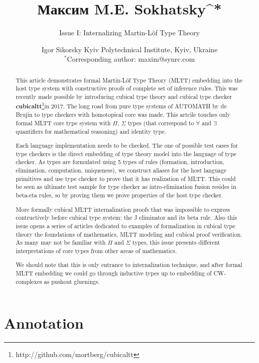 \documentclass{article}
\theoremstyle{definition}
\begin{document}
\title{\small Максим M.E. Sokhatsky^{*}}
\author{Issue I: Internalizing Martin-Löf Type Theory}
\date{ \small Igor Sikorsky Kyiv Polytechnical Institute, Kyiv, Ukraine\\
       \small $^*$Corresponding author: maxim@synrc.com}

\maketitle

\section*{Annotation}

\begin{abstract}

This article demonstrates formal Martin-Löf Type Theory (MLTT) embedding into the host type system
with constructive proofs of complete set of inference rules. This was recently made possible
by introducing cubical type theory and cubical type checker
{\bf cubicaltt}\footnote{http://github.com/mortberg/cubicaltt}in 2017.
The long road from pure type systems of AUTOMATH by de Brujin to type checkers with homotopical core
was made. This artcile touches only formal MLTT core type system
with $\Pi$, $\Sigma$ types (that correspond to $\forall$ and $\exists$ quantifiers for mathematical reasoning)
and identity type.

Each language implementation needs to be checked. The one of possible test cases
for type checkers is the direct embedding of type theory model into the language of type checker.
As types are formulated using 5 types of rules (formation,
introduction, elimination, computation, uniqueness), we construct aliases
for the host language primitives and use type checker to prove that it has realization of MLTT.
This could be seen as ultimate test sample for type checker as
intro-elimination fusion resides in beta-eta rules, so by proving them
we prove properties of the host type checker.

More formally cubical MLTT internalization proofs that was impossible to express contructively
before cubical type system: the J eliminator and its beta rule.
Also this issue opens a series of articles dedicated to examples of formalization in
cubical type theory the foundations of mathematics, MLTT modeling and
cubical proof verification. As many may not be familiar with
$\Pi$ and $\Sigma$ types, this issue presents different interpretations
of core types from other areas of mathematics.

We should note that this is only entrance
to internalization technique, and after formal MLTT embedding we
could go through inductive types up to
embedding of CW-complexes as pushout gluenings.
\end{abstract}
\end{document}

